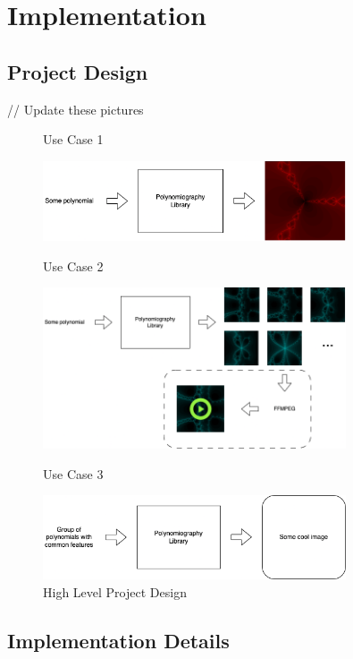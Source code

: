\chapter{Implementation}

\section{Project Design}
// Update these pictures
\begin{figure}[!htbp]
    \label{fig:project-design}
    Use Case 1
    \begin{center}
    \includegraphics[width=0.8\textwidth]{Imgs/fig2.png}    
    \end{center}
    Use Case 2
    \begin{center}
    \includegraphics[width=0.8\textwidth]{Imgs/fig3.png}  
    \end{center}
    Use Case 3
    \begin{center}
    \includegraphics[width=0.8\textwidth]{Imgs/fig6.png}
    \caption{High Level Project Design}
    \end{center}
\end{figure}

\section{Implementation Details}


